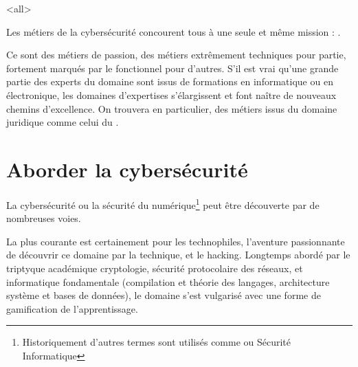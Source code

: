 \mode<all>{}


Les métiers de la cybersécurité concourent tous à une seule et même mission : .

Ce sont des métiers de passion, des métiers extrêmement techniques pour partie, fortement marqués par le fonctionnel pour d'autres. S'il est vrai qu'une grande partie des experts du domaine sont issus de formations en informatique ou en électronique, les domaines d'expertises s'élargissent et font naître de nouveaux chemins d'excellence. On trouvera en particulier, des métiers issus du domaine juridique comme celui du .    





\section{Aborder la cybersécurité}


La cybersécurité ou la sécurité du numérique\footnote{Historiquement d'autres termes sont utilisés comme   ou  Sécurité Informatique} peut être découverte par de nombreuses voies.

La plus courante est certainement pour les technophiles, l'aventure passionnante de découvrir ce domaine par la technique, et le hacking.  Longtemps abordé par le triptyque académique cryptologie,   sécurité  protocolaire des réseaux, et informatique fondamentale (compilation et théorie des langages, architecture système et bases de données), le domaine s'est vulgarisé avec une forme de gamification de l'apprentissage.

